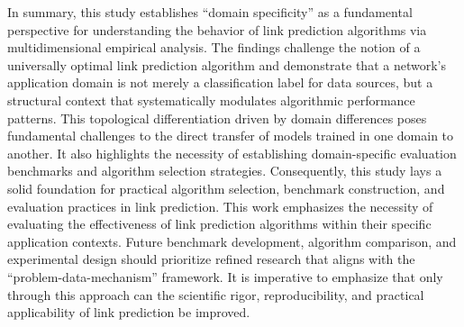 \documentclass{article}
\begin{document}
In summary, this study establishes ``domain specificity'' as a fundamental perspective for understanding the behavior of link prediction algorithms via multidimensional empirical analysis. The findings challenge the notion of a universally optimal link prediction algorithm and demonstrate that a network's application domain is not merely a classification label for data sources, but a structural context that systematically modulates algorithmic performance patterns. This topological differentiation driven by domain differences poses fundamental challenges to the direct transfer of models trained in one domain to another. It also highlights the necessity of establishing domain-specific evaluation benchmarks and algorithm selection strategies. Consequently, this study lays a solid foundation for practical algorithm selection, benchmark construction, and evaluation practices in link prediction. This work emphasizes the necessity of evaluating the effectiveness of link prediction algorithms within their specific application contexts. Future benchmark development, algorithm comparison, and experimental design should prioritize refined research that aligns with the ``problem-data-mechanism'' framework. It is imperative to emphasize that only through this approach can the scientific rigor, reproducibility, and practical applicability of link prediction be improved.
\end{document}
